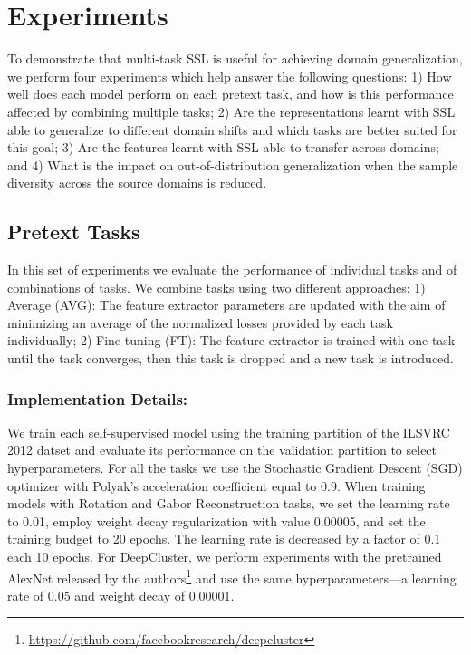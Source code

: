 \documentclass[runningheads]{llncs}
\begin{document}
\section{Experiments}
To demonstrate that multi-task SSL is useful for achieving domain generalization, we perform four experiments which help answer the following questions: 1) How well does each model perform on each pretext task, and how is this performance affected by combining multiple tasks; 2) Are the representations learnt with SSL able to generalize to different domain shifts and which tasks are better suited for this goal; 3) Are the features learnt with SSL able to transfer across domains; and 4) What is the impact on out-of-distribution generalization when the sample diversity across the source domains is reduced. 

\subsection{Pretext Tasks}
In this set of experiments we evaluate the performance of individual tasks and of combinations of tasks. We combine tasks using two different approaches: 1) Average (AVG): The feature extractor parameters are updated with the aim of minimizing an average of the normalized losses provided by each task individually; 2) Fine-tuning (FT): The feature extractor is trained with one task until the task converges, then this task is dropped and a new task is introduced. \vspace{-5pt}

\vspace{-5pt}\subsubsection{Implementation Details:} We train each self-supervised model using the training partition of the ILSVRC 2012 datset and evaluate its performance on the validation partition to select hyperparameters. For all the tasks we use the Stochastic Gradient Descent (SGD) optimizer with Polyak's acceleration coefficient equal to 0.9. When training models with Rotation and Gabor Reconstruction tasks, we set the learning rate to 0.01, employ weight decay regularization with value 0.00005, and set the training budget to 20 epochs. The learning rate is decreased by a factor of 0.1 each 10 epochs. For DeepCluster, we perform experiments with the pretrained AlexNet released by the authors\footnote{\url{https://github.com/facebookresearch/deepcluster}} and use the same hyperparameters---a learning rate of 0.05 and weight decay of 0.00001. 
\end{document}

